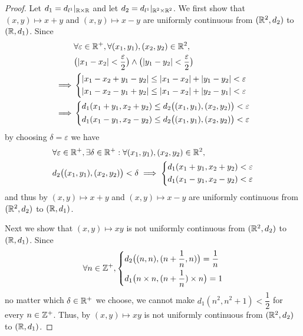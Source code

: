 \begin{proof}
  Let \(d_1 = d_{l^1}|_{\mathbb{R} \times \mathbb{R}}\) and let \(d_2 = d_{l^1}|_{\mathbb{R}^2 \times \mathbb{R}^2}\).
  We first show that \((x, y) \mapsto x + y\) and \((x, y) \mapsto x - y\) are uniformly continuous from \((\mathbb{R}^2, d_2)\) to \((\mathbb{R}, d_1)\).
  Since
  \begin{align*}
             & \forall \varepsilon \in \R^+, \forall (x_1, y_1), (x_2, y_2) \in \R^2,                                      \\
             & \big(\abs{x_1 - x_2} < \dfrac{\varepsilon}{2}\big) \land \big(\abs{y_1 - y_2} < \dfrac{\varepsilon}{2}\big) \\
    \implies & \begin{dcases}
                 \abs{x_1 - x_2 + y_1 - y_2} \leq \abs{x_1 - x_2} + \abs{y_1 - y_2} < \varepsilon \\
                 \abs{x_1 - x_2 - y_1 + y_2} \leq \abs{x_1 - x_2} + \abs{y_2 - y_1} < \varepsilon \\
               \end{dcases}                            \\
    \implies & \begin{dcases}
                 d_1(x_1 + y_1, x_2 + y_2) \leq d_2\big((x_1, y_1), (x_2, y_2)\big) < \varepsilon \\
                 d_1(x_1 - y_1, x_2 - y_2) \leq d_2\big((x_1, y_1), (x_2, y_2)\big) < \varepsilon
               \end{dcases}
  \end{align*}
  by choosing \(\delta = \varepsilon\) we have
  \begin{align*}
     & \forall \varepsilon \in \mathbb{R}^+, \exists \delta \in \mathbb{R}^+ : \forall (x_1, y_1), (x_2, y_2) \in \mathbb{R}^2, \\
     & d_2\big((x_1, y_1), (x_2, y_2)\big) < \delta \implies \begin{dcases}
                                                               d_1(x_1 + y_1, x_2 + y_2) < \varepsilon \\
                                                               d_1(x_1 - y_1, x_2 - y_2) < \varepsilon
                                                             \end{dcases}
  \end{align*}
  and thus by  \((x, y) \mapsto x + y\) and \((x, y) \mapsto x - y\) are uniformly continuous from \((\mathbb{R}^2, d_2)\) to \((\mathbb{R}, d_1)\).

  Next we show that \((x, y) \mapsto xy\) is not uniformly continuous from \((\mathbb{R}^2, d_2)\) to \((\mathbb{R}, d_1)\).
  Since
  \[
    \forall n \in \mathbb{Z}^+, \begin{dcases}
      d_2\big((n, n), (n + \dfrac{1}{n}, n)\big) = \dfrac{1}{n} \\
      d_1\big(n \times n, (n + \dfrac{1}{n}) \times n\big) = 1
    \end{dcases}
  \]
  no matter which \(\delta \in \mathbb{R}^+\) we choose, we cannot make \(d_1(n^2, n^2 + 1) < \dfrac{1}{2}\) for every \(n \in \mathbb{Z}^+\).
  Thus, by  \((x, y) \mapsto xy\) is not uniformly continuous from \((\mathbb{R}^2, d_2)\) to \((\mathbb{R}, d_1)\).


\end{proof}
